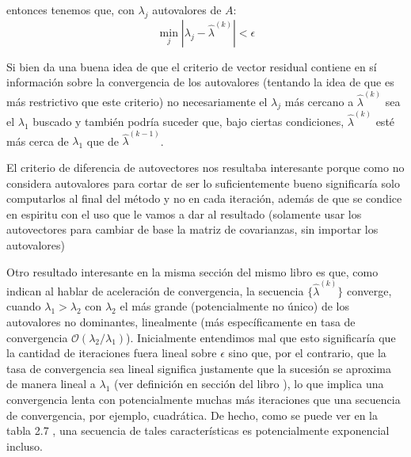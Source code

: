 entonces tenemos que, con $\lambda_j$ autovalores de $A$:
\begin{equation}
 \min_{j}|\lambda_j - \hat{\lambda}^{(k)}| < \epsilon
\end{equation}

Si bien da una buena idea de que el criterio de vector residual contiene en sí información sobre la convergencia de los autovalores (tentando la idea de que es más restrictivo que este criterio) no necesariamente el $\lambda_j$ más cercano a $\hat{\lambda}^{(k)}$ sea el $\lambda_1$ buscado y también podría suceder que, bajo ciertas condiciones, $\hat{\lambda}^{(k)}$ esté más cerca de $\lambda_1$ que de $\hat{\lambda}^{(k-1)}$.

El criterio de diferencia de autovectores nos resultaba interesante porque como no considera autovalores para cortar de ser lo suficientemente bueno significaría solo computarlos al final del método y no en cada iteración, además de que se condice en espiritu con el uso que le vamos a dar al resultado (solamente usar los autovectores para cambiar de base la matriz de covarianzas, sin importar los autovalores)

Otro resultado interesante en la misma sección del mismo libro es que, como indican al hablar de aceleración de convergencia, la secuencia $\{\hat{\lambda}^{(k)}\}$ converge, cuando $\lambda_1 > \lambda_2 $ con $\lambda_2$ el más grande (potencialmente no único) de los autovalores no dominantes, linealmente (más específicamente en tasa de convergencia $\mathcal{O}(\lambda_2/\lambda_1)$).
Inicialmente entendimos mal que esto significaría que la cantidad de iteraciones fuera lineal sobre $\epsilon$ sino que, por el contrario, que la tasa de convergencia sea lineal significa justamente que la sucesión se aproxima de manera lineal a $\lambda_1$ (ver definición en sección del libro \cite{Burden}), lo que implica una convergencia lenta con potencialmente muchas más iteraciones que una secuencia de convergencia, por ejemplo, cuadrática. De hecho, como se puede ver en la tabla 2.7 \cite{Burden}, una secuencia de tales características es potencialmente exponencial incluso.\\

